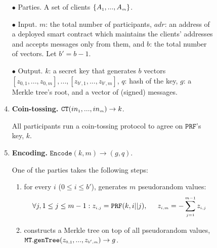 



\begin{figure}[ht]%
\setlength{\fboxsep}{1pt}
\begin{center}
    \begin{tcolorbox}[enhanced,width=4.77in, height=95mm,right=.5mm,
    drop fuzzy shadow southwest,
    colframe=black,colback=white]


\small{
\vspace{-2mm}
\begin{enumerate}[leftmargin=-.01mm]
\item[$\bullet$]    {Parties.} A set of clients $\{    A_{\scriptscriptstyle 1},...,  A_{\scriptscriptstyle m}\}$.
%
\item[$\bullet$]    {Input.}  $m$: the total number of participants, $adr$: an address of a deployed smart contract which maintains the clients' addresses and accepts messages only from them, and $b$: the total number of vectors. Let $b'=b-1$. 
%
\item[$\bullet$]   {Output.}  $k$: a secret key that generates $b$ vectors $[z_{\scriptscriptstyle 0,1},...,z_{\scriptscriptstyle 0,m}],...,[z_{\scriptscriptstyle b',1},...,z_{\scriptscriptstyle b',m}]$, $q$: hash of the key,  $g$: a Merkle tree's root, and a vector of (signed) messages. 




\item {\textbf{Coin-tossing.} $\mathtt{CT} (in_{\scriptscriptstyle 1},..., in_{\scriptscriptstyle m})\rightarrow k$}. 

All participants run a coin-tossing protocol to agree on $\mathtt{PRF}$'s key, $k$.
\item\label{ZSPA:val-gen}  {\textbf{Encoding.} $\mathtt{Encode}(k, m)\rightarrow (g,q)$}.

 One of the parties takes the following steps:  
\begin{enumerate}%

\item for every $i$ ($0\leq i \leq b'$), generates $m$ pseudorandom values: 
%
\vspace{-3mm}
%
 $$\forall j, 1\leq j \leq m-1: z_{\scriptscriptstyle i,j}=\mathtt{PRF}(k,i||j), \hspace{5mm} z_{\scriptscriptstyle i,m}=-\sum\limits^{\scriptscriptstyle m-1}_{\scriptscriptstyle j=1}z_{\scriptscriptstyle i,j}$$
\vspace{-3mm}
\item   constructs a Merkle tree on top of all pseudorandom values,  $\mathtt{MT.genTree}(z_{\scriptscriptstyle 0,1},...,z_{\scriptscriptstyle b',m})\rightarrow g$. 


\end{enumerate}
\end{enumerate}}
\end{tcolorbox}
\end{center}
\end{figure}
